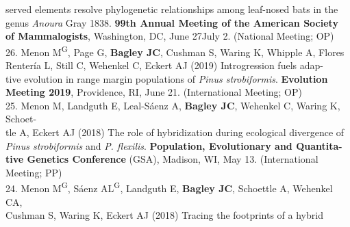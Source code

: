 \documentclass[margin,line]{res}
\begin{document}
\begin{resume}
\hspace*{8mm} served elements resolve phylogenetic relationships among leaf-nosed bats in the\\
\hspace*{8mm} genus \emph{Anoura} Gray 1838. \textbf{99th Annual Meeting of the American Society}\\ \vspace{2mm}
\hspace*{8mm}\textbf{of Mammalogists}, Washington, DC, June 27\textendash July 2. (National Meeting; OP)\\ 
26. Menon M\textsuperscript{G}, Page G, \textbf{Bagley JC}, Cushman S, Waring K, Whipple A, Flores\textendash \\
\hspace*{8mm} Renter\'{i}a L, Still C, Wehenkel C, Eckert AJ (2019) Introgression fuels adap-\\
\hspace*{8mm} tive evolution in range margin populations of \emph{Pinus strobiformis}. \textbf{Evolution} \\ \vspace{2mm}
\hspace*{8mm}\textbf{Meeting 2019}, Providence, RI, June 21. (International Meeting; OP) \\
25. Menon M, Landguth E, Leal-S\'{a}enz A, \textbf{Bagley JC}, Wehenkel C, Waring K, Schoet-\\
\hspace*{8mm} tle A, Eckert AJ (2018) The role of hybridization during ecological divergence of \\
\hspace*{8mm} \textit{Pinus strobiformis} and \textit{P. flexilis}. \textbf{Population, Evolutionary and Quantita-}\\
\hspace*{8mm} \textbf{tive Genetics Conference} (GSA), Madison, WI, May 13. (International\\ \vspace{2mm}
\hspace*{8mm}Meeting; PP) \\
24. Menon M\textsuperscript{G}, S\'{a}enz AL\textsuperscript{G}, Landguth E, \textbf{Bagley JC}, Schoettle A, Wehenkel CA,\\
\hspace*{8mm} Cushman S, Waring K, Eckert AJ (2018) Tracing the footprints of a hybrid\\

\end{resume}
\end{document}
